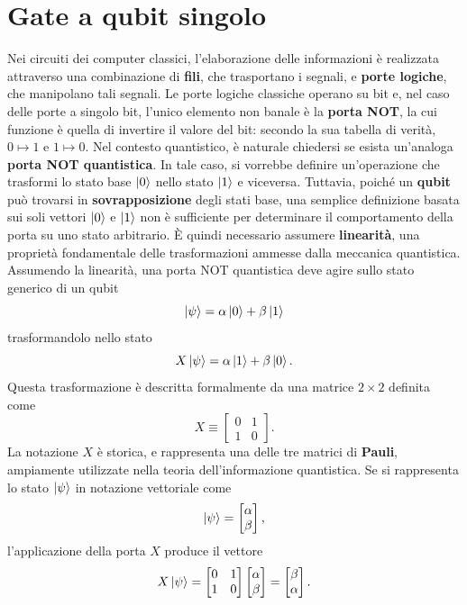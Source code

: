 \documentclass[a4paper,12pt]{report}
\theoremstyle{plain}
\begin{document}
\section{Gate a qubit singolo}
Nei circuiti dei computer classici, l'elaborazione delle informazioni è realizzata attraverso una combinazione di \textbf{fili}, che trasportano i segnali, e \textbf{porte logiche}, che manipolano tali segnali. Le porte logiche classiche operano su bit e, nel caso delle porte a singolo bit, l'unico elemento non banale è la \textbf{porta NOT}, la cui funzione è quella di invertire il valore del bit: secondo la sua tabella di verità, $0 \mapsto 1$ e $1 \mapsto 0$.
Nel contesto quantistico, è naturale chiedersi se esista un'analoga \textbf{porta NOT quantistica}. In tale caso, si vorrebbe definire un'operazione che trasformi lo stato base $\ket{0}$ nello stato $\ket{1}$ e viceversa. Tuttavia, poiché un \textbf{qubit} può trovarsi in \textbf{sovrapposizione} degli stati base, una semplice definizione basata sui soli vettori $\ket{0}$ e $\ket{1}$ non è sufficiente per determinare il comportamento della porta su uno stato arbitrario. È quindi necessario assumere \textbf{linearità}, una proprietà fondamentale delle trasformazioni ammesse dalla meccanica quantistica.
Assumendo la linearità, una porta NOT quantistica deve agire sullo stato generico di un qubit
\[
\ket{\psi} = \alpha\ket{0} + \beta\ket{1}
\]
trasformandolo nello stato
\[
X\ket{\psi} = \alpha\ket{1} + \beta\ket{0}.
\]
Questa trasformazione è descritta formalmente da una matrice $2 \times 2$ definita come
\[
X \equiv \begin{bmatrix}
0 & 1 \\
1 & 0
\end{bmatrix}.
\]
La notazione $X$ è storica, e rappresenta una delle tre matrici di \textbf{Pauli}, ampiamente utilizzate nella teoria dell'informazione quantistica.
Se si rappresenta lo stato $\ket{\psi}$ in notazione vettoriale come
\[
\ket{\psi} = \begin{bmatrix}
\alpha \\
\beta
\end{bmatrix},
\]
l'applicazione della porta $X$ produce il vettore
\[
X\ket{\psi} = \begin{bmatrix}
0 & 1 \\
1 & 0
\end{bmatrix}
\begin{bmatrix}
\alpha \\
\beta
\end{bmatrix}
= \begin{bmatrix}
\beta \\
\alpha
\end{bmatrix}.
\]
\end{document}

